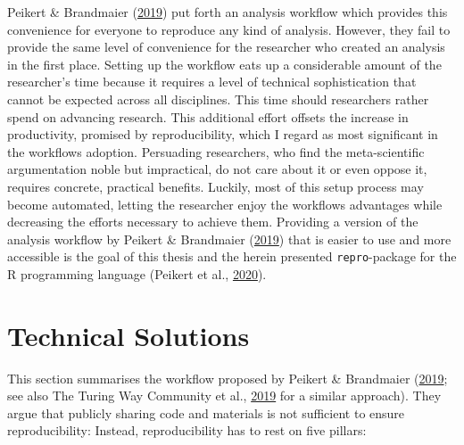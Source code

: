 \documentclass[12pt,a4paper,twoside]{article}
\begin{document}
Peikert \& Brandmaier (\protect\hyperlink{ref-peikertReproducibleDataAnalysis2019}{2019}) put forth an analysis workflow which provides this convenience for everyone to reproduce any kind of analysis.
However, they fail to provide the same level of convenience for the researcher who created an analysis in the first place.
Setting up the workflow eats up a considerable amount of the researcher's time because it requires a level of technical sophistication that cannot be expected across all disciplines. This time should researchers rather spend on advancing research.
This additional effort offsets the increase in productivity, promised by reproducibility, which I regard as most significant in the workflows adoption.
Persuading researchers, who find the meta-scientific argumentation noble but impractical, do not care about it or even oppose it, requires concrete, practical benefits.
Luckily, most of this setup process may become automated, letting the researcher enjoy the workflows advantages while decreasing the efforts necessary to achieve them.
Providing a version of the analysis workflow by Peikert \& Brandmaier (\protect\hyperlink{ref-peikertReproducibleDataAnalysis2019}{2019}) that is easier to use and more accessible is the goal of this thesis and the herein presented \texttt{repro}-package for the R programming language (Peikert et al., \protect\hyperlink{ref-R-repro}{2020}).

\hypertarget{technical-solutions}{%
\section{Technical Solutions}\label{technical-solutions}}

This section summarises the workflow proposed by Peikert \& Brandmaier (\protect\hyperlink{ref-peikertReproducibleDataAnalysis2019}{2019}; see also The Turing Way Community et al., \protect\hyperlink{ref-theturingwaycommunityTuringWayHandbook2019}{2019} for a similar approach).
They argue that publicly sharing code and materials is not sufficient to ensure reproducibility:
Instead, reproducibility has to rest on five pillars:
\end{document}
